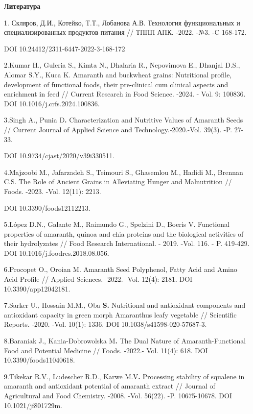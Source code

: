 {{\bfseries Литература}

1. Скляров, Д.И., Котейко, Т.Т., Лобанова А.В. Технология функциональных
и специализированных продуктов питания // ТППП АПК. -2022. -№3. -C
168-172.

DOI 10.24412/2311-6447-2022-3-168-172

2.Kumar H., Guleria S., Kimta N., Dhalaria R., Nepovimova E., Dhanjal
D.S., Alomar S.Y., Kuca K. Amaranth and buckwheat grains: Nutritional
profile, development of functional foods, their pre-clinical cum
clinical aspects and enrichment in feed // Current Research in Food
Science. -2024. - Vol. 9: 100836. DOI 10.1016/j.crfs.2024.100836.

3.Singh A., Punia D{\bfseries .} Characterization and Nutritive Values of
Amaranth Seeds // Current Journal of Applied Science and
Technology.\emph{-}2020.-Vol. 39(3). -P. 27-33.

DOI 10.9734/cjast/2020/v39i330511.

4.Majzoobi M., Jafarzadeh S., Teimouri S., Ghasemlou M., Hadidi M.,
Brennan C.S. The Role of Ancient Grains in Alleviating Hunger and
Malnutrition // Foods. -2023. -Vol. 12(11): 2213.

DOI 10.3390/foods12112213.

5.López D.N., Galante M., Raimundo G., Spelzini D., Boeris V. Functional
properties of amaranth, quinoa and chia proteins and the biological
activities of their hydrolyzates // Food Research International. - 2019.
-Vol. 116. - P. 419-429. DOI 10.1016/j.foodres.2018.08.056.

6.Procopet O., Oroian M. Amaranth Seed Polyphenol, Fatty Acid and Amino
Acid Profile // Applied Sciences.- 2022. -Vol. 12(4): 2181. DOI
10.3390/app12042181.

7.Sarker U., Hossain M.M., Oba {\bfseries S.} Nutritional and antioxidant
components and antioxidant capacity in green morph Amaranthus leafy
vegetable // Scientific Reports\emph{.} -2020. -Vol. 10(1): 1336. DOI
10.1038/s41598-020-57687-3.

8.Baraniak J., Kania-Dobrowolska M{\bfseries .} The Dual Nature of
Amaranth-Functional Food and Potential Medicine // Foods. -2022.- Vol.
11(4): 618. DOI 10.3390/foods11040618.

9.Tikekar R.V., Ludescher R.D., Karwe M.V{\bfseries .} Processing stability
of squalene in amaranth and antioxidant potential of amaranth extract //
Journal of Agricultural and Food Chemistry. -2008. -Vol. 56(22). -P.
10675-10678. DOI 10.1021/jf801729m.

}
